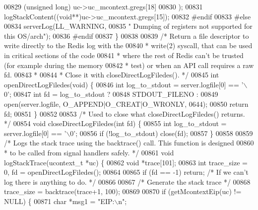 \begin{DoxyCode}
{{{{{{{{{{{{{{{{{{{{{{{{{{{{{{{{{{{{{{{{{{{{{{{{{{{{{{{{{{{{{{00829         (\textcolor{keywordtype}{unsigned} \textcolor{keywordtype}{long}) uc->uc\_mcontext.gregs[18]
00830     );
00831     logStackContent((\textcolor{keywordtype}{void}**)uc->uc\_mcontext.gregs[15]);
00832     \textcolor{preprocessor}{#}\textcolor{preprocessor}{endif}
00833 \textcolor{preprocessor}{#}\textcolor{preprocessor}{else}
00834     serverLog(LL\_WARNING,
00835         \textcolor{stringliteral}{"  Dumping of registers not supported for this OS/arch"});
00836 \textcolor{preprocessor}{#}\textcolor{preprocessor}{endif}
00837 \}
00838 
00839 \textcolor{comment}{/* Return a file descriptor to write directly to the Redis log with the}
00840 \textcolor{comment}{ * write(2) syscall, that can be used in critical sections of the code}
00841 \textcolor{comment}{ * where the rest of Redis can't be trusted (for example during the memory}
00842 \textcolor{comment}{ * test) or when an API call requires a raw fd.}
00843 \textcolor{comment}{ *}
00844 \textcolor{comment}{ * Close it with closeDirectLogFiledes(). */}
00845 \textcolor{keywordtype}{int} openDirectLogFiledes(\textcolor{keywordtype}{void}) \{
00846     \textcolor{keywordtype}{int} log\_to\_stdout = server.logfile[0] == \textcolor{stringliteral}{'\(\backslash\)0'};
00847     \textcolor{keywordtype}{int} fd = log\_to\_stdout ?
00848         STDOUT\_FILENO :
00849         open(server.logfile, O\_APPEND|O\_CREAT|O\_WRONLY, 0644);
00850     \textcolor{keywordflow}{return} fd;
00851 \}
00852 
00853 \textcolor{comment}{/* Used to close what closeDirectLogFiledes() returns. */}
00854 \textcolor{keywordtype}{void} closeDirectLogFiledes(\textcolor{keywordtype}{int} fd) \{
00855     \textcolor{keywordtype}{int} log\_to\_stdout = server.logfile[0] == \textcolor{stringliteral}{'\(\backslash\)0'};
00856     \textcolor{keywordflow}{if} (!log\_to\_stdout) close(fd);
00857 \}
00858 
00859 \textcolor{comment}{/* Logs the stack trace using the backtrace() call. This function is designed}
00860 \textcolor{comment}{ * to be called from signal handlers safely. */}
00861 \textcolor{keywordtype}{void} logStackTrace(ucontext\_t *uc) \{
00862     \textcolor{keywordtype}{void} *trace[101];
00863     \textcolor{keywordtype}{int} trace\_size = 0, fd = openDirectLogFiledes();
00864 
00865     \textcolor{keywordflow}{if} (fd == -1) \textcolor{keywordflow}{return}; \textcolor{comment}{/* If we can't log there is anything to do. */}
00866 
00867     \textcolor{comment}{/* Generate the stack trace */}
00868     trace\_size = backtrace(trace+1, 100);
00869 
00870     \textcolor{keywordflow}{if} (getMcontextEip(uc) != NULL) \{
00871         \textcolor{keywordtype}{char} *msg1 = \textcolor{stringliteral}{"EIP:\(\backslash\)n"};
}}}}}}}}}}}}}}}}}}}}}}}}}}}}}}}}}}}}}}}}}}}}}}}}}}}}}}}}}}}}}}
\end{DoxyCode}
